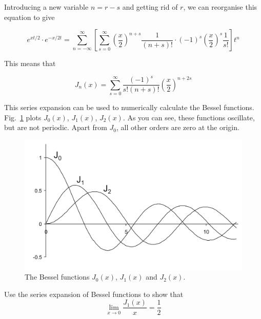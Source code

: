 \noindent{}Introducing a new variable $n = r - s$ and getting rid of $r$, we can reorganise this equation to give

\begin{equation}
e^{xt/2} \cdot e^{-x/2t} = \sum_{n = -\infty}^{\infty} \left[ \sum_{s = 0}^{\infty} {\left(\frac{x}{2}\right)}^{n+s} \frac{1}{(n+s)!} \cdot (-1)^s {\left(\frac{x}{2}\right)}^{s} \frac{1}{s!} \right] t^n
\end{equation} 

This means that

\begin{equation}
J_n(x) = \sum_{s = 0}^{\infty} \frac {{(-1)}^s}{s!(n+s)!} {\left(\frac{x}{2}\right)}^{n+2s} \label{eq-bessel-series}
\end{equation} 

This series expansion can be used to numerically calculate the Bessel functions. Fig.~\ref{fig-bessel-J} plots $J_0(x)$, $J_1(x)$, $J_2(x)$. As you can see, these functions oscillate, but are not periodic. Apart from $J_0$, all other orders are zero at the origin.

\begin{figure}
\centering
\includegraphics{bessel/figures/j}
\caption{The Bessel functions $J_0(x)$, $J_1(x)$ and $J_2(x)$.}
\label{fig-bessel-J}
\end{figure}

\begin{exer}
Use the series expansion of Bessel functions to show that
$$\lim_{x \to 0} \frac{J_1(x)}{x}= \frac{1}{2}$$
\end{exer}

